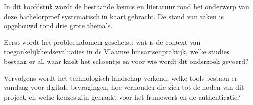 




In dit hoofdstuk wordt de bestaande kennis en literatuur rond het onderwerp van deze
bachelorproef systematisch in kaart gebracht. De stand van zaken is opgebouwd rond drie
grote thema's.
\medskip

Eerst wordt het probleemdomein geschetst: wat is de context van
toegankelijkheidsevaluaties in de Vlaamse huisartsenpraktijk, welke studies bestaan er al,
waar knelt het schoentje en voor wie wordt dit onderzoek gevoerd?
\medskip

Vervolgens wordt het technologisch landschap verkend: welke tools bestaan er vandaag voor digitale bevragingen,
hoe verhouden die zich tot de noden van dit project, en welke keuzes zijn gemaakt voor het
framework en de authenticatie?
\medskip

